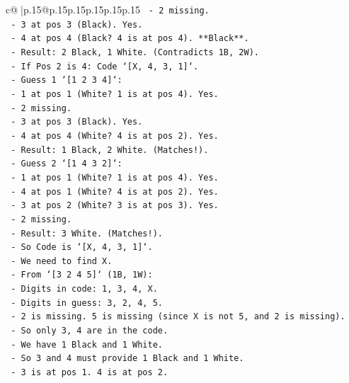\documentclass{article}
\begin{document}
{\begin{supertabular}{c@{$\;$}|p{.15\linewidth}@{}p{.15\linewidth}p{.15\linewidth}p{.15\linewidth}p{.15\linewidth}p{.15\linewidth}}
{{{\texttt{          {-} 2 missing.} \\
\texttt{          {-} 3 at pos 3 (Black). Yes.} \\
\texttt{          {-} 4 at pos 4 (Black? 4 is at pos 4). **Black**.} \\
\texttt{          {-} Result: 2 Black, 1 White. (Contradicts 1B, 2W).} \\
\texttt{      {-} If Pos 2 is 4: Code `{[}X, 4, 3, 1{]}`.} \\
\texttt{        {-} Guess 1 `{[}1 2 3 4{]}`:} \\
\texttt{          {-} 1 at pos 1 (White? 1 is at pos 4). Yes.} \\
\texttt{          {-} 2 missing.} \\
\texttt{          {-} 3 at pos 3 (Black). Yes.} \\
\texttt{          {-} 4 at pos 4 (White? 4 is at pos 2). Yes.} \\
\texttt{          {-} Result: 1 Black, 2 White. (Matches!).} \\
\texttt{        {-} Guess 2 `{[}1 4 3 2{]}`:} \\
\texttt{          {-} 1 at pos 1 (White? 1 is at pos 4). Yes.} \\
\texttt{          {-} 4 at pos 1 (White? 4 is at pos 2). Yes.} \\
\texttt{          {-} 3 at pos 2 (White? 3 is at pos 3). Yes.} \\
\texttt{          {-} 2 missing.} \\
\texttt{          {-} Result: 3 White. (Matches!).} \\
\texttt{        {-} So Code is `{[}X, 4, 3, 1{]}`.} \\
\texttt{        {-} We need to find X.} \\
\texttt{        {-} From `{[}3 2 4 5{]}` (1B, 1W):} \\
\texttt{          {-} Digits in code: 1, 3, 4, X.} \\
\texttt{          {-} Digits in guess: 3, 2, 4, 5.} \\
\texttt{          {-} 2 is missing. 5 is missing (since X is not 5, and 2 is missing).} \\
\texttt{          {-} So only 3, 4 are in the code.} \\
\texttt{          {-} We have 1 Black and 1 White.} \\
\texttt{          {-} So 3 and 4 must provide 1 Black and 1 White.} \\
\texttt{          {-} 3 is at pos 1. 4 is at pos 2.} \\
}}}
\end{supertabular}}
\end{document}
